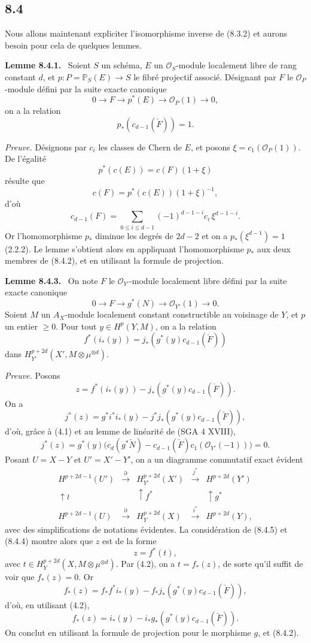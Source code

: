 \documentclass[11pt]{article}
\newenvironment{statement}[1]{\par\medskip\noindent\textbf{#1.}\ }{\par\medskip}
\begin{document}
\subsection*{8.4}

Nous allons maintenant expliciter l'isomorphisme inverse de (8.3.2) et aurons besoin pour cela de quelques lemmes.

\begin{statement}{Lemme 8.4.1}
Soient $S$ un schéma, $E$ un $\mathcal O_S$-module localement libre de rang constant $d$, et $p:P=\mathbb P_S(E)\to S$ le fibré projectif associé. Désignant par $F$ le $\mathcal O_P$-module défini par la suite exacte canonique
\[
0\to F\to p^*(E)\to\mathcal O_P(1)\to0,
\]
on a la relation
\[
p_*(c_{d-1}(\check F))=1.
\]
\end{statement}

\emph{Preuve.} Désignons par $c_i$ les classes de Chern de $E$, et posons $\xi=c_1(\mathcal O_P(1))$. De l'égalité
\[
p^*(c(E))=c(F)(1+\xi)
\]
résulte que
\[
c(F)=p^*(c(E))(1+\xi)^{-1},
\]
d'où
\[
c_{d-1}(F)=\sum_{0\le i\le d-1}(-1)^{d-1-i}c_i\,\xi^{d-1-i}.
\tag{8.4.2}
\]
Or l'homomorphisme $p_*$ diminue les degrés de $2d-2$ et on a $p_*(\xi^{d-1})=1$ (2.2.2). Le lemme s'obtient alors en appliquant l'homomorphisme $p_*$ aux deux membres de (8.4.2), et en utilisant la formule de projection.

\begin{statement}{Lemme 8.4.3}
On note $F$ le $\mathcal O_{Y'}$-module localement libre défini par la suite exacte canonique
\[
0\to F\to g^*(N)\to\mathcal O_{Y'}(1)\to0.
\]
Soient $M$ un $A_X$-module localement constant constructible au voisinage de $Y$, et $p$ un entier $\ge0$. Pour tout $y\in H^p(Y,M)$, on a la relation
\[
f^*(i_*(y))=j_*(g^*(y)c_{d-1}(\check F))
\]
dans $H_{Y'}^{p+2d}(X',M\otimes\mu^{\otimes d})$.
\end{statement}

\emph{Preuve.} Posons
\[
z=f^*(i_*(y))-j_*(g^*(y)c_{d-1}(\check F)).
\]
On a
\[
j^*(z)=g^*i^*i_*(y)-j^*j_*(g^*(y)c_{d-1}(\check F)),
\]
d'où, grâce à (4.1) et au lemme de linéarité de (SGA 4 XVIII),
\[
j^*(z)=g^*(y)\bigl(c_d(g^*\check N)-c_{d-1}(\check F)c_1(\mathcal O_{Y'}(-1))\bigr)=0.
\tag{8.4.4}
\]
Posant $U=X-Y$ et $U'=X'-Y'$, on a un diagramme commutatif exact évident
\[
\begin{array}{ccccc}
H^{p+2d-1}(U')&\xrightarrow{\partial}&H^{p+2d}_{Y'}(X')&\xrightarrow{j^*}&H^{p+2d}(Y')\\
\uparrow\wr&&\uparrow f^*&&\uparrow g^*\\
H^{p+2d-1}(U)&\xrightarrow{\partial}&H_Y^{p+2d}(X)&\xrightarrow{i^*}&H^{p+2d}(Y),
\end{array}
\tag{8.4.5}
\]
avec des simplifications de notations évidentes. La considération de (8.4.5) et (8.4.4) montre alors que $z$ est de la forme
\[
z=f^*(t),
\]
avec $t\in H_Y^{p+2d}(X,M\otimes\mu^{\otimes d})$. Par (4.2), on a $t=f_*(z)$, de sorte qu'il suffit de voir que $f_*(z)=0$. Or
\[
f_*(z)=f_*f^*i_*(y)-f_*j_*(g^*(y)c_{d-1}(\check F)),
\]
d'où, en utilisant (4.2),
\[
f_*(z)=i_*(y)-i_*g_*(g^*(y)c_{d-1}(\check F)).
\]
On conclut en utilisant la formule de projection pour le morphisme $g$, et (8.4.2).
\end{document}
